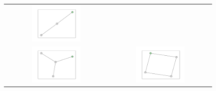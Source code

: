 \documentclass[12pt, a4paper]{extarticle}
\begin{document}
\begin{figure}
\begin{tabularx}{\textwidth}{cc}
\includegraphics[width=0.5\textwidth]{task11-graphlets/3_16-25-23.pdf} \\
\includegraphics[width=0.5\textwidth]{task11-graphlets/4_16-18-19-23.pdf} &
\includegraphics[width=0.5\textwidth]{task11-graphlets/4_18-22-23-24.pdf} \\
\end{tabularx}\end{figure}
\end{document}
